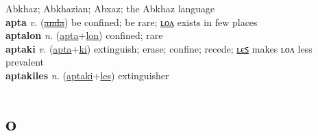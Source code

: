 Abkhaz; Abkhazian; Abxaz; the Abkhaz language \label{'apswatilip} \\
\textbf{apta} \textit{v.} (\hyperref[amla]{\sout{amla}})
be confined; be rare; \hyperref[aptalon]{ʟᴏᴧ} exists in few places \label{apta} \\
\textbf{aptalon} \textit{n.} (\hyperref[apta]{apta}+\hyperref[lon]{lon})
confined; rare \label{aptalon} \\
\textbf{aptaki} \textit{v.} (\hyperref[apta]{apta}+\hyperref[ki]{ki})
extinguish; erase; confine; recede; \hyperref[aptakiles]{ʟєꜱ} makes ʟᴏᴧ less prevalent \label{aptaki} \\
\textbf{aptakiles} \textit{n.} (\hyperref[aptaki]{aptaki}+\hyperref[les]{les})
extinguisher \label{aptakiles} 

\section{o}

